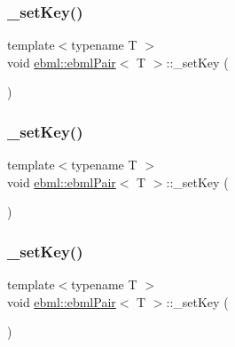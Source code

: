 \subsubsection{\texorpdfstring{\+\_\+set\+Key()}{\_setKey()}\hspace{0.1cm}{\footnotesize\ttfamily [1/4]}}
{\footnotesize\ttfamily template$<$typename T $>$ \\
void \mbox{\hyperlink{classebml_1_1ebmlPair}{ebml\+::ebml\+Pair}}$<$ T $>$\+::\+\_\+set\+Key (\begin{DoxyParamCaption}\item[{const \mbox{\hyperlink{namespaceebml_adad533b7705a16bb360fe56380c5e7be}{ebml\+Element\+\_\+sp}} \&}]{ }\end{DoxyParamCaption})\hspace{0.3cm}{\ttfamily [protected]}}

\mbox{\label{classebml_1_1ebmlPair_a322d953e0ec4e42cb630aa2f1b97dc75}} 
\subsubsection{\texorpdfstring{\+\_\+set\+Key()}{\_setKey()}\hspace{0.1cm}{\footnotesize\ttfamily [2/4]}}
{\footnotesize\ttfamily template$<$typename T $>$ \\
void \mbox{\hyperlink{classebml_1_1ebmlPair}{ebml\+::ebml\+Pair}}$<$ T $>$\+::\+\_\+set\+Key (\begin{DoxyParamCaption}\item[{\mbox{\hyperlink{namespaceebml_adad533b7705a16bb360fe56380c5e7be}{ebml\+Element\+\_\+sp}} \&\&}]{ }\end{DoxyParamCaption})\hspace{0.3cm}{\ttfamily [protected]}}

\mbox{\label{classebml_1_1ebmlPair_ad8a103b58e64c0ae4eb55a4233d41615}} 
\subsubsection{\texorpdfstring{\+\_\+set\+Key()}{\_setKey()}\hspace{0.1cm}{\footnotesize\ttfamily [3/4]}}
{\footnotesize\ttfamily template$<$typename T $>$ \\
void \mbox{\hyperlink{classebml_1_1ebmlPair}{ebml\+::ebml\+Pair}}$<$ T $>$\+::\+\_\+set\+Key (\begin{DoxyParamCaption}\item[{const T \&}]{ }\end{DoxyParamCaption})\hspace{0.3cm}{\ttfamily [protected]}}

